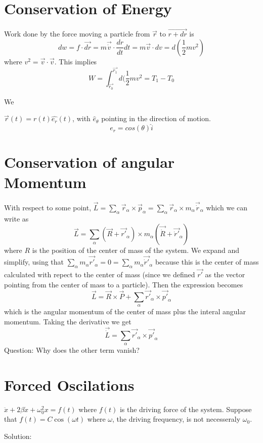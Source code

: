 \documentclass{homework}
\begin{document}
\section{Conservation of Energy}

Work done by the force moving a particle from $\vec{r}$ to $\vec{r + dr}$ is 
\[dw = f\cdot \vec{dr} = m\vec{\dot{v}} \cdot \frac{dr}{dt}dt = m\vec{v} \cdot dv = d(\frac{1}{2}mv^2) \]
where $v^2 = \vec{v} \cdot \vec{v}$. This implies 
\[W = \int_{\vec{r_0}}^{\vec{r_1}}d(\frac{1}{2}mv^2 = T_1 - T_0 \]





We 





$\vec{r}(t) = r(t)\hat{e_r}(t)$, with $\hat e_{\theta}$ pointing in the direction of motion.
\[e_r = cos(\theta)\hat i\]




\section{Conservation of angular Momentum}
With respect to some point, $\vec{L} = \sum_{\alpha}\vec{r}_{\alpha} \times \vec{p}_{\alpha} = \sum_{\alpha}\vec{r}_{\alpha} \times  m_{\alpha}\vec{\dot{r}}_{\alpha}$ which we can write as 
\[\vec{L} = \sum_{\alpha} (\vec{R} + \vec{r'}_{\alpha}) \times m_{\alpha}(\vec{\dot{R}} + \vec{\dot{r}'}_{\alpha})\]
where $R$ is the position of the center of mass of the system. We expand and simplify, using that $\sum_{\alpha}m_{\alpha}\vec {r'}_{\alpha} = 0= \sum_{\alpha}m_{\alpha}\vec {\dot{r}'}_{\alpha}$ because this is the center of mass calculated with repect to the center of mass (since we defined $\vec{r'}$ as the vector pointing from the center of mass to a particle). Then the expression becomes
\[\vec{L} = \vec{R} \times \vec{P} + \sum_{\alpha}\vec{r'}_{\alpha} \times \vec{p'}_{\alpha}\]
which is the angular momentum of the center of mass plus the interal angular momentum. 
Taking the derivative we get
\[\vec{\dot{L}} = \sum_{\alpha}\vec{r'}_{\alpha} \times \vec{p'}_{\alpha}\]
Question: Why does the other term vanish?




\section{Forced Oscilations}

$\ddot x + 2\beta \dot x + \omega_0^2 x = f(t)$ where $f(t)$ is the driving force of the system. Suppose that $f(t) = C \cos (\omega t)$ where $\omega$, the driving frequency, is not necesseraly $\omega_0$. 

Solution: 
\end{document}
